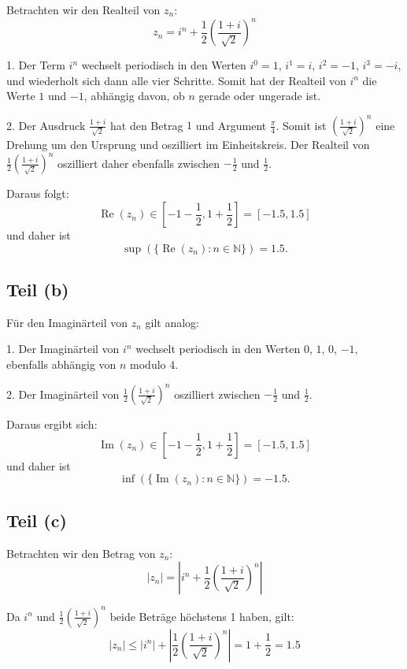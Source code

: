 \documentclass[11pt]{article}
\begin{document}
Betrachten wir den Realteil von \( z_n \):
\[
z_n = i^n + \frac{1}{2} \left( \frac{1 + i}{\sqrt{2}} \right)^n
\]

1. Der Term \( i^n \) wechselt periodisch in den Werten \( i^0 = 1 \), \( i^1 = i \), \( i^2 = -1 \), \( i^3 = -i \), und wiederholt sich dann alle vier Schritte. Somit hat der Realteil von \( i^n \) die Werte \( 1 \) und \( -1 \), abhängig davon, ob \( n \) gerade oder ungerade ist.

2. Der Ausdruck \( \frac{1 + i}{\sqrt{2}} \) hat den Betrag \( 1 \) und Argument \( \frac{\pi}{4} \). Somit ist \( \left( \frac{1 + i}{\sqrt{2}} \right)^n \) eine Drehung um den Ursprung und oszilliert im Einheitskreis. Der Realteil von \( \frac{1}{2} \left( \frac{1 + i}{\sqrt{2}} \right)^n \) oszilliert daher ebenfalls zwischen \( -\frac{1}{2} \) und \( \frac{1}{2} \).

Daraus folgt:
\[
\operatorname{Re}(z_n) \in \left[ -1 - \frac{1}{2}, 1 + \frac{1}{2} \right] = [-1.5, 1.5]
\]
und daher ist
\[
\sup(\{\operatorname{Re}(z_n) : n \in \mathbb{N}\}) = 1.5.
\]

\subsection*{Teil (b)}

Für den Imaginärteil von \( z_n \) gilt analog:

1. Der Imaginärteil von \( i^n \) wechselt periodisch in den Werten \( 0 \), \( 1 \), \( 0 \), \( -1 \), ebenfalls abhängig von \( n \) modulo 4.

2. Der Imaginärteil von \( \frac{1}{2} \left( \frac{1 + i}{\sqrt{2}} \right)^n \) oszilliert zwischen \( -\frac{1}{2} \) und \( \frac{1}{2} \).

Daraus ergibt sich:
\[
\operatorname{Im}(z_n) \in \left[ -1 - \frac{1}{2}, 1 + \frac{1}{2} \right] = [-1.5, 1.5]
\]
und daher ist
\[
\inf(\{\operatorname{Im}(z_n) : n \in \mathbb{N}\}) = -1.5.
\]

\subsection*{Teil (c)}

Betrachten wir den Betrag von \( z_n \):
\[
|z_n| = \left| i^n + \frac{1}{2} \left( \frac{1 + i}{\sqrt{2}} \right)^n \right|
\]

Da \( i^n \) und \( \frac{1}{2} \left( \frac{1 + i}{\sqrt{2}} \right)^n \) beide Beträge höchstens 1 haben, gilt:
\[
|z_n| \leq |i^n| + \left| \frac{1}{2} \left( \frac{1 + i}{\sqrt{2}} \right)^n \right| = 1 + \frac{1}{2} = 1.5
\]
\end{document}
